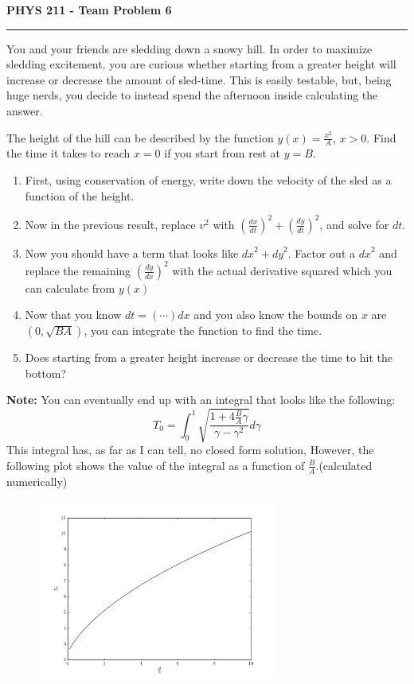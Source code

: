\documentclass{article}
\begin{document}
\thispagestyle{empty}
\textbf{PHYS 211 - Team Problem 6}
\hrule
\vspace{.3in}
You and your friends are sledding down a snowy hill. In order to maximize sledding excitement, you are curious whether starting from a greater height will increase or decrease the amount of sled-time. This is easily testable, but, being huge nerds, you decide to instead spend the afternoon inside calculating the answer.

The height of the hill can be described by the function $y(x)=\frac{x^2}{A}$, $x>0$. Find the time it takes to reach $x=0$ if you start from rest at $y=B$.
\begin{enumerate}
  \item First, using conservation of energy, write down the velocity of the sled as a function of the height.
  \item Now in the previous result, replace $v^2$ with $(\frac{dx}{dt})^2 + (\frac{dy}{dt})^2$, and solve for $dt$.
  \item Now you should have a term that looks like ${dx}^2 + {dy}^2$. Factor out a ${dx}^2$ and replace the remaining $(\frac{dy}{dx})^2$ with the actual derivative squared which you can calculate from $y(x)$
  \item Now that you know $dt=(\cdots)dx$ and you also know the bounds on $x$ are $(0,\sqrt{BA})$, you can integrate the function to find the time.
  \item Does starting from a greater height increase or decrease the time to hit the bottom?
\end{enumerate}

\textbf{Note:} You can eventually end up with an integral that looks like the following:
\begin{equation*}
  T_0 = \int_{0}^{1} \sqrt{\frac{1 + 4\frac{B}{A}\gamma}{\gamma-\gamma^2}}d\gamma
\end{equation*}
This integral has, as far as I can tell, no closed form solution, However, the following plot shows the value of the integral as a function of $\frac{B}{A}$.(calculated numerically)
\begin{figure}[h!]
  \centering
  \includegraphics[width=0.7\textwidth]{figures/fig1.png}
\end{figure}
\end{document}
